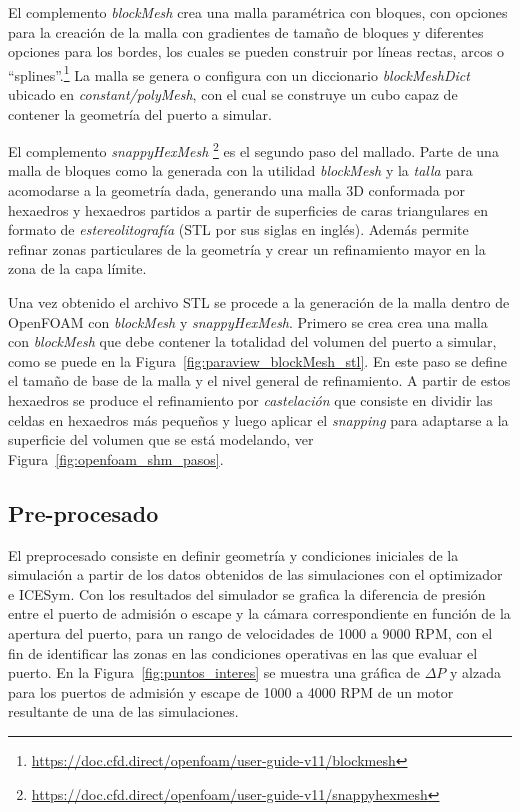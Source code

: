 El complemento \emph{blockMesh} crea una malla paramétrica con bloques, con
opciones para la creación de la malla con gradientes de tamaño de bloques y
diferentes opciones para los bordes, los cuales se pueden construir por líneas
rectas, arcos o
``splines''.\footnote{\url{https://doc.cfd.direct/openfoam/user-guide-v11/blockmesh}}
%
La malla se genera o configura con un diccionario \emph{blockMeshDict} ubicado
en \emph{constant/polyMesh}, con el cual se construye un cubo capaz de contener
la geometría del puerto a simular.

El complemento \emph{snappyHexMesh}
\footnote{\url{https://doc.cfd.direct/openfoam/user-guide-v11/snappyhexmesh}} es
el segundo paso del mallado.
%
Parte de una malla de bloques como la generada con la utilidad \emph{blockMesh}
y la \emph{talla} para acomodarse a la geometría dada, generando una malla 3D
conformada por hexaedros y hexaedros partidos a partir de superficies de caras
triangulares en formato de \emph{estereolitografía} (STL por sus siglas en
inglés).
%
Además permite refinar zonas particulares de la geometría y crear un
refinamiento mayor en la zona de la capa límite.

Una vez obtenido el archivo STL se procede a la generación de la malla dentro de
OpenFOAM con \emph{blockMesh} y \emph{snappyHexMesh}.
%
Primero se crea crea una malla con \emph{blockMesh} que  debe contener la
totalidad del volumen del puerto a simular, como se puede en la
Figura~\ref{fig:paraview_blockMesh_stl}.
%
En este paso se define el tamaño de base de la malla y el nivel general de
refinamiento.
%
A partir de estos hexaedros se produce el refinamiento por \emph{castelación}
que consiste en dividir las celdas en hexaedros más pequeños y luego aplicar el
\emph{snapping} para adaptarse a la superficie del volumen que se está
modelando, ver Figura~\ref{fig:openfoam_shm_pasos}.
%

\subsection{Pre-procesado}
%
El preprocesado consiste en definir geometría y condiciones iniciales de la
simulación a partir de los datos obtenidos de las simulaciones con el
optimizador e ICESym.
%
Con los resultados del simulador se grafica la diferencia de presión entre el
puerto de admisión o escape y la cámara correspondiente en función de la apertura
del puerto, para un rango de velocidades de 1000 a 9000 RPM, con el fin de
identificar las zonas en las condiciones operativas en las que evaluar el puerto.
%
En la Figura~\ref{fig:puntos_interes} se muestra una gráfica de $\Delta P$ y
alzada para los puertos de admisión y escape de 1000 a 4000 RPM de un motor
resultante de una de las simulaciones.

